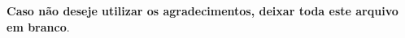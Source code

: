 \begin{agradecimentos}
\textbf{Caso não deseje utilizar os agradecimentos, deixar toda este arquivo
em branco}.
\end{agradecimentos}
